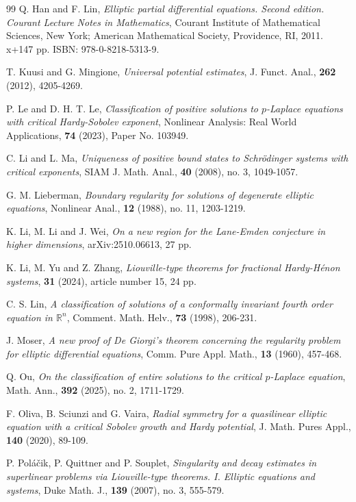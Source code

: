 \documentclass[12pt]{amsart}
\theoremstyle{definition}
\theoremstyle{remark}
\theoremstyle{conclusion}
\theoremstyle{conjecture}
\numberwithin{equation}{section}
\begin{document}
\begin{thebibliography}{99}
 Q. Han and F. Lin, {\it Elliptic partial differential equations. Second edition. Courant Lecture Notes in Mathematics}, Courant Institute of Mathematical Sciences, New York; American Mathematical Society, Providence, RI, 2011. x+147 pp. ISBN: 978-0-8218-5313-9.

 T. Kuusi and G. Mingione, {\it Universal potential estimates}, J. Funct. Anal., \textbf{262} (2012), 4205-4269.

 P. Le and D. H. T. Le, {\it Classification of positive solutions to $p$-Laplace equations with critical Hardy-Sobolev exponent}, Nonlinear Analysis: Real World Applications, \textbf{74} (2023), Paper No. 103949.

 C. Li and L. Ma, {\it Uniqueness of positive bound states to Schr\"{o}dinger systems with critical exponents}, SIAM J. Math. Anal., \textbf{40} (2008), no. 3, 1049-1057.

 G. M. Lieberman, {\it Boundary regularity for solutions of degenerate elliptic equations}, Nonlinear Anal., \textbf{12} (1988), no. 11, 1203-1219.

 K. Li, M. Li and J. Wei, {\it On a new region for the Lane-Emden conjecture in higher dimensions}, arXiv:2510.06613, 27 pp.

 K. Li, M. Yu and Z. Zhang, {\it Liouville-type theorems for fractional Hardy-H\'{e}non systems}, \textbf{31} (2024), article number 15, 24 pp.

 C. S. Lin, {\it A classification of solutions of a conformally invariant fourth order equation in $\mathbb{R}^{n}$}, Comment. Math. Helv., \textbf{73} (1998), 206-231.

 J. Moser, {\it A new proof of De Giorgi's theorem concerning the regularity problem for elliptic differential equations}, Comm. Pure Appl. Math., \textbf{13} (1960), 457-468.

 Q. Ou, {\it On the classification of entire solutions to the critical $p$-Laplace equation}, Math. Ann., \textbf{392} (2025), no. 2, 1711-1729.

 F. Oliva, B. Sciunzi and G. Vaira, {\it Radial symmetry for a quasilinear elliptic equation with a critical Sobolev growth and Hardy potential}, J. Math. Pures Appl., \textbf{140} (2020), 89-109.

 P. Pol\'{a}\v{c}ik, P. Quittner and P. Souplet, {\it Singularity and decay estimates in superlinear problems via Liouville-type theorems. I. Elliptic equations and systems}, Duke Math. J.,  \textbf{139} (2007), no. 3, 555-579.


\end{thebibliography}
\end{document}
